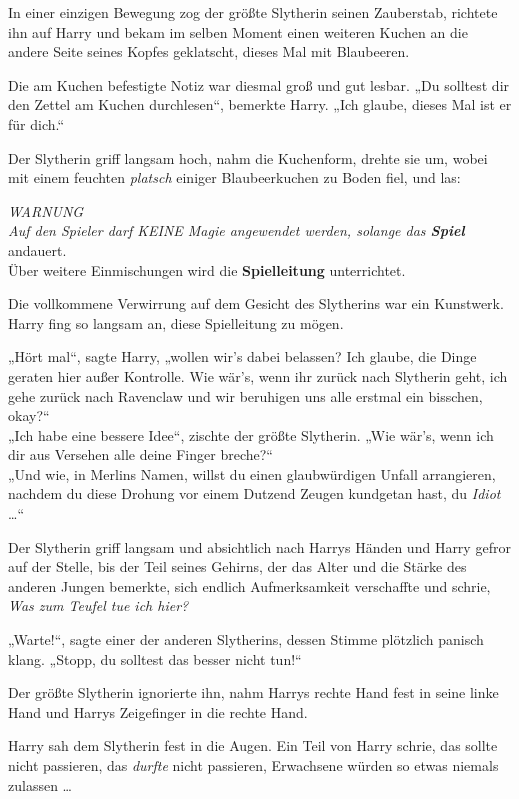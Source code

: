 {In einer einzigen Bewegung zog der größte Slytherin seinen Zauberstab, richtete ihn auf Harry und bekam im selben Moment einen weiteren Kuchen an die andere Seite seines Kopfes geklatscht, dieses Mal mit Blaubeeren.

Die am Kuchen befestigte Notiz war diesmal groß und gut lesbar. „Du solltest dir den Zettel am Kuchen durchlesen“, bemerkte Harry. „Ich glaube, dieses Mal ist er für dich.“

Der Slytherin griff langsam hoch, nahm die Kuchenform, drehte sie um, wobei mit einem feuchten \emph{platsch} einiger Blaubeerkuchen zu Boden fiel, und las:

\emph{WARNUNG\\ Auf den Spieler darf KEINE Magie angewendet werden, solange das \textbf{Spiel}} andauert.\\ Über weitere Einmischungen wird die \textbf{Spielleitung} unterrichtet.

Die vollkommene Verwirrung auf dem Gesicht des Slytherins war ein Kunstwerk. Harry fing so langsam an, diese Spielleitung zu mögen.

„Hört mal“, sagte Harry, „wollen wir's dabei belassen? Ich glaube, die Dinge geraten hier außer Kontrolle. Wie wär's, wenn ihr zurück nach Slytherin geht, ich gehe zurück nach Ravenclaw und wir beruhigen uns alle erstmal ein bisschen, okay?“\\ „Ich habe eine bessere Idee“, zischte der größte Slytherin. „Wie wär's, wenn ich dir aus Versehen alle deine Finger breche?“\\ „Und wie, in Merlins Namen, willst du einen glaubwürdigen Unfall arrangieren, nachdem du diese Drohung vor einem Dutzend Zeugen kundgetan hast, du \emph{Idiot} …“

Der Slytherin griff langsam und absichtlich nach Harrys Händen und Harry gefror auf der Stelle, bis der Teil seines Gehirns, der das Alter und die Stärke des anderen Jungen bemerkte, sich endlich Aufmerksamkeit verschaffte und schrie, \emph{Was zum Teufel tue ich hier?}

„Warte!“, sagte einer der anderen Slytherins, dessen Stimme plötzlich panisch klang. „Stopp, du solltest das besser nicht tun!“

Der größte Slytherin ignorierte ihn, nahm Harrys rechte Hand fest in seine linke Hand und Harrys Zeigefinger in die rechte Hand.

Harry sah dem Slytherin fest in die Augen. Ein Teil von Harry schrie, das sollte nicht passieren, das \emph{durfte} nicht passieren, Erwachsene würden so etwas niemals zulassen …

}
